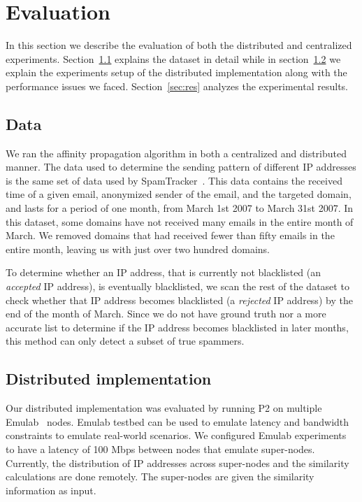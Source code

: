 \section{Evaluation}
\label{eval}

In this section we describe the evaluation of both the distributed and centralized experiments. Section~\ref{sec:data} explains the dataset in detail while in section~\ref{eval:dist} we explain the experiments setup of the distributed implementation along with the performance issues we faced. Section~\ref{sec:res} analyzes the experimental results.

\subsection{Data}
\label{sec:data}
We ran the affinity propagation algorithm in both a centralized and distributed manner. The data used to determine the sending pattern of different IP addresses is the same set of data used by SpamTracker~\cite{bb}. This data contains the received time of a given email, anonymized sender of the email, and the targeted domain, and lasts for a period of one month, from March 1st 2007 to March 31st 2007. In this dataset, some domains have not received many emails in the entire month of March. We removed domains that had received fewer than fifty emails in the entire month, leaving us with just over two hundred domains. 

To determine whether an IP address, that is currently not blacklisted (an \emph{accepted} IP address), is eventually blacklisted, we scan the rest of the dataset to check whether that IP address becomes blacklisted (a \emph{rejected} IP address) by the end of the month of March. Since we do not have ground truth nor a more accurate list to determine if the IP address becomes blacklisted in later months, this method can only detect a subset of true spammers.

\subsection{Distributed implementation}
\label{eval:dist}
Our distributed implementation was evaluated by running P2 on multiple Emulab~\cite{emulab} nodes. Emulab testbed can be used to emulate latency and bandwidth constraints to emulate real-world scenarios. We configured Emulab experiments to have a latency of 100 Mbps between nodes that emulate super-nodes. Currently, the distribution of IP addresses across super-nodes and the similarity calculations are done remotely. The super-nodes are given the similarity information as input.

